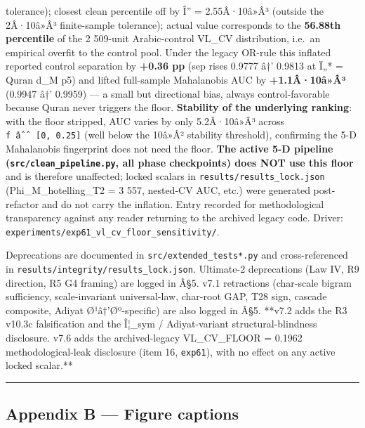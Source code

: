 \documentclass[
]{article}
\begin{document}
\begin{enumerate}
  tolerance); closest clean percentile off by Î'' = 2.55Â·10â»Â³
  (outside the 2Â·10â»Â³ finite-sample tolerance); actual value
  corresponds to the \textbf{56.88th percentile} of the 2 509-unit
  Arabic-control VL\_CV distribution, i.e.~an empirical overfit to the
  control pool. Under the legacy OR-rule this inflated reported control
  separation by \textbf{+0.36 pp} (sep rises 0.9777 â†' 0.9813 at Ï„* =
  Quran d\_M p5) and lifted full-sample Mahalanobis AUC by
  \textbf{+1.1Â·10â»Â³} (0.9947 â†' 0.9959) --- a small but directional
  bias, always control-favorable because Quran never triggers the floor.
  \textbf{Stability of the underlying ranking}: with the floor stripped,
  AUC varies by only 5.2Â·10â»Â³ across \texttt{f\ âˆˆ\ {[}0,\ 0.25{]}}
  (well below the 10â»Â² stability threshold), confirming the 5-D
  Mahalanobis fingerprint does not need the floor. \textbf{The active
  5-D pipeline (\texttt{src/clean\_pipeline.py}, all phase checkpoints)
  does NOT use this floor} and is therefore unaffected; locked scalars
  in \texttt{results/results\_lock.json} (Phi\_M\_hotelling\_T2 = 3 557,
  nested-CV AUC, etc.) were generated post-refactor and do not carry the
  inflation. Entry recorded for methodological transparency against any
  reader returning to the archived legacy code. Driver:
  \texttt{experiments/exp61\_vl\_cv\_floor\_sensitivity/}.
\end{enumerate}

Deprecations are documented in \texttt{src/extended\_tests*.py} and
cross-referenced in \texttt{results/integrity/results\_lock.json}.
Ultimate-2 deprecations (Law IV, R9 direction, R5 G4 framing) are logged
in Â§5. v7.1 retractions (char-scale bigram sufficiency, scale-invariant
universal-law, char-root GAP, T28 sign, cascade composite, Adiyat
Ø¹â†'Øº-specific) are also logged in Â§5. **v7.2 adds the R3 v10.3c
falsification and the Î¦\_sym / Adiyat-variant structural-blindness
disclosure. v7.6 adds the archived-legacy VL\_CV\_FLOOR = 0.1962
methodological-leak disclosure (item 16, \texttt{exp61}), with no effect
on any active locked scalar.**

\begin{center}\rule{0.5\linewidth}{0.5pt}\end{center}

\subsection{Appendix B --- Figure
captions}\label{appendix-b-figure-captions}
\end{document}
